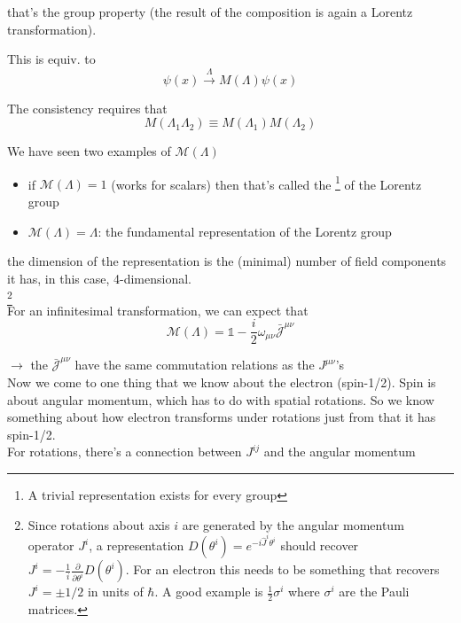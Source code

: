 \documentclass[11pt]{article}
\begin{document}
	that's the group property (the result of the composition is again a Lorentz transformation).
	
	This is equiv. to 
	\[ \psi(x) \xrightarrow{\Lambda} M(\Lambda) \psi(x)\]
	
	The consistency requires that \[ M(\Lambda_1\Lambda_2) \equiv M(\Lambda_1) M(\Lambda_2)\]


	We have seen two examples of $\mathcal{M}(\Lambda)$ 
	
	\begin{itemize}
			\item if $\mathcal{M}(\Lambda) = 1$ (works for scalars) then that's called the \footnote{A trivial representation exists for every group} of the Lorentz group
			
			\item $\mathcal{M}(\Lambda) = \Lambda$: the fundamental representation of the Lorentz group
			
	\end{itemize}

	the dimension of the representation is the (minimal) number of field components it has, in this case, 4-dimensional.\\
	
	 \footnote{Since rotations about axis $i$ are generated by the angular momentum operator $J^i$, a representation $D(\theta^i) = e^{-i\hat{J}^i\theta^i}$ should recover $J^i = -\frac{1}{i} \frac{\partial}{\partial \theta^i}D(\theta^i)$. For an electron this needs to be something that recovers $J^i = \pm 1/2$ in units of $\hbar$. A good example is $\frac{1}{2}\sigma^i$ where $\sigma^i$ are the Pauli matrices.}\\
	
	For an infinitesimal transformation, we can expect that \[ \mathcal{M}(\Lambda) = \mathbb{1} - \frac{i}{2} \omega_{\mu\nu} \bar{\mathcal{J}}^{\mu\nu} \] 

	$\rightarrow$ the $\bar{\mathcal{J}}^{\mu\nu}$ have the same commutation relations as the $J^{\mu\nu}$'s\\

	Now we come to one thing that we know about the electron (spin-1/2). Spin is about angular momentum, which has to do with spatial rotations. So we know something about how electron transforms under rotations just from that it has spin-1/2.\\

	For rotations, there's a connection between $J^{ij}$ and the angular momentum
	
\end{document}
